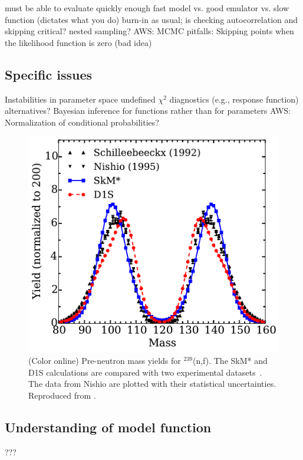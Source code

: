   \bi
    \I must be able to evaluate quickly enough
    \I fast model vs. good emulator vs. slow function (dictates what you do)
    \I burn-in as usual; is checking autocorrelation and skipping critical?
    \I nested sampling?
    \I AWS: MCMC pitfalls: Skipping points when the likelihood
    function is zero (bad idea)
  \ei


\subsection{Specific issues}  \label{subsec:issues}

  \bi
    \I Instabilities in parameter space
      \bi
        \I undefined $\chi^2$
        \I diagnostics (e.g., response function) 
        \I alternatives?
      \ei     
      \I Bayesian inference for functions rather than for parameters
      \I AWS: Normalization of conditional probabilities?
  \ei

\begin{figure}[h]
\begin{center}
\includegraphics[width=0.6\columnwidth]{figures/fission_yields}
\caption{(Color online) Pre-neutron mass yields for $^{239}$(n,f). The SkM* 
and D1S calculations are compared with two experimental datasets~\cite{schillebeeckx_comparative_1992,nishio_measurement_1995}. The data from 
Nishio are plotted with their statistical uncertainties. Reproduced from \cite{regnier2016}.
}
\label{fig:fission_yields}
\end{center}
\end{figure}


\subsection{Understanding of model function}  \label{subsec:model_function}

  \bi
    \I ???
  \ei



